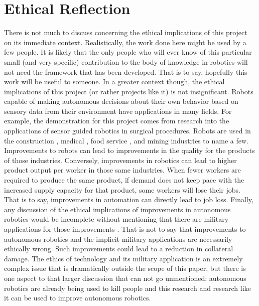 \documentclass{cslthse-msc}
\begin{document}
\section{Ethical Reflection}
\label{sec:Anal_Con:Ethics_Ref}
There is not much to discuss concerning the ethical implications of this project on its immediate context. Realistically, the work done here might be used by a few people. It is likely that the only people who will ever know of this particular small (and very specific) contribution to the body of knowledge in robotics will not need the framework that has been developed. That is to say, hopefully this work will be useful to someone. In a greater context though, the ethical implications of this project (or rather projects like it) is not insignificant. Robots capable of making autonomous decisions about their own behavior based on sensory data from their environment have applications in many fields. For example, the demonstration for this project comes from research into the applications of sensor guided robotics in surgical procedures. Robots are used in the construction \cite{Ethics:Con}, medical \cite{Ethics:Med}, food service \cite{Ethics:Foo}, and mining \cite{Ethics:Min} industries to name a few. Improvements to robots can lead to improvements in the quality for the products of those industries. Conversely, improvements in robotics can lead to higher product output per worker in those same industries. When fewer workers are required to produce the same product, if demand does not keep pace with the increased supply capacity for that product, some workers will lose their jobs. That is to say, improvements in automation can directly lead to job loss. Finally, any discussion of the ethical implications of improvements in autonomous robotics would be incomplete without mentioning that there are military applications for those improvements \cite{Ethics:Mil}. That is not to say that improvements to autonomous robotics and the implicit military applications are necessarily ethically wrong. Such improvements could lead to a reduction in collateral damage. The ethics of technology and its military application is an extremely complex issue that is dramatically outside the scope of this paper, but there is one aspect to that larger discussion that can not go unmentioned: autonomous robotics are already being used to kill people and this research and research like it can be used to improve autonomous robotics.
\end{document}

